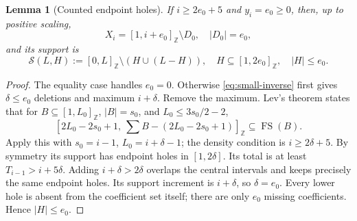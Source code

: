\documentclass[11pt,a4paper]{article}
\newcommand{\FS}{\operatorname{FS}}
\newcommand{\Z}{\mathbb Z}
\newtheorem{lemma}[theorem]{Lemma}
\begin{document}
\begin{lemma}[Counted endpoint holes]\label{lem:counted}
If $i\ge2e_0+5$ and $y_i=e_0\ge0$, then, up to positive scaling,
\[
 X_i=[1,i+e_0]_{\Z}\setminus D_0,\quad |D_0|=e_0,
\]
and its support is
\[
 \mathcal S(L,H):=[0,L]_{\Z}\setminus(H\cup(L-H)),\quad
 H\subseteq[1,2e_0]_{\Z},\quad |H|\le e_0.
\]
\end{lemma}
\begin{proof}
The equality case handles $e_0=0$. Otherwise
\eqref{eq:small-inverse} first gives $\delta\le e_0$ deletions and maximum
$i+\delta$. Remove the maximum. Lev's theorem \cite[Theorem 1]{Lev}
states that for $B\subseteq[1,L_0]_{\Z}$, $|B|=s_0$, and
$L_0\le3s_0/2-2$,
\[
 [2L_0-2s_0+1,\ \sum B-(2L_0-2s_0+1)]_{\Z}\subseteq\FS(B).
\]
Apply this with $s_0=i-1$, $L_0=i+\delta-1$; the density condition is
$i\ge2\delta+5$. By symmetry its support has endpoint holes in
$[1,2\delta]$. Its total is at least $T_{i-1}>i+5\delta$. Adding
$i+\delta>2\delta$ overlaps the central intervals and keeps precisely
the same endpoint holes. Its support increment is $i+\delta$, so
$\delta=e_0$. Every lower hole is absent from the coefficient set itself;
there are only $e_0$ missing coefficients. Hence $|H|\le e_0$.
\end{proof}
\end{document}

